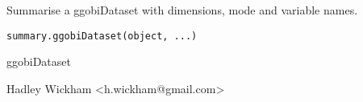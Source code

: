 \documentclass{article}
\begin{document}
\begin{Description}\relax
Summarise a ggobiDataset with dimensions, mode and variable names.
\end{Description}
\begin{Usage}
\begin{verbatim}summary.ggobiDataset(object, ...)\end{verbatim}
\end{Usage}
\begin{Arguments}
\begin{ldescription}
\item[\code{object}] ggobiDataset
\item[\code{...}] 
\end{ldescription}
\end{Arguments}
\begin{Details}\relax
\end{Details}
\begin{Author}\relax
Hadley Wickham <h.wickham@gmail.com>
\end{Author}
\begin{Examples}
\begin{ExampleCode}\end{ExampleCode}
\end{Examples}
\end{document}
